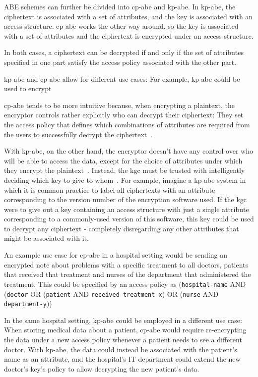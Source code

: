 ABE schemes can further be divided into \acrfull{cp-abe} and \acrfull{kp-abe}.
In \acrshort{kp-abe}, the ciphertext is associated with a set of attributes, and the key is associated with an access structure.
\acrshort{cp-abe} works the other way around, so the key is associated with a set of attributes and the ciphertext is encrypted under an access structure.

In both cases, a ciphertext can be decrypted if and only if the set of attributes specified in one part satisfy the access policy associated with the other part.

\acrshort{kp-abe} and \acrshort{cp-abe} allow for different use cases:
For example, \acrshort{kp-abe} could be used to encrypt

\acrshort{cp-abe} tends to be more intuitive because, when encrypting a plaintext, the encryptor controls rather explicitly who can decrypt their ciphertext:
They set the access policy that defines which combinations of attributes are required from the users to successfully decrypt the ciphertext~\cite{bethencourt_ciphertext-policy_2007}.

With \acrshort{kp-abe}, on the other hand, the encryptor doesn't have any control over who will be able to access the data, except for the choice of attributes under which they encrypt the plaintext~\cite{bethencourt_ciphertext-policy_2007}.
Instead, the \acrlong{kgc} must be trusted with intelligently deciding which key to give to whom~\cite{bethencourt_ciphertext-policy_2007}.
For example, imagine a \acrshort{kp-abe} system in which it is common practice to label all ciphertexts with an attribute corresponding to the version number of the encryption software used.
If the \acrshort{kgc} were to give out a key containing an access structure with just a single attribute corresponding to a commonly-used version of this software, this key could be used to decrypt any ciphertext - completely disregarding any other attributes that might be associated with it.

An example use case for \acrshort{cp-abe} in a hospital setting would be sending an encrypted note about problems with a specific treatment to all doctors, patients that received that treatment and nurses of the department that administered the treatment.
This could be specified by an access policy as (\texttt{hospital-name} AND (\texttt{doctor} OR (\texttt{patient} AND \texttt{received-treatment-x}) OR (\texttt{nurse} AND \texttt{department-y}))

In the same hospital setting, \acrshort{kp-abe} could be employed in a different use case: When storing medical data about a patient, \acrshort{cp-abe} would require re-encrypting the data under a new access policy whenever a patient needs to see a different doctor.
With \acrshort{kp-abe}, the data could instead be associated with the patient's name as an attribute, and the hospital's IT department could extend the new doctor's key's policy to allow decrypting the new patient's data.

